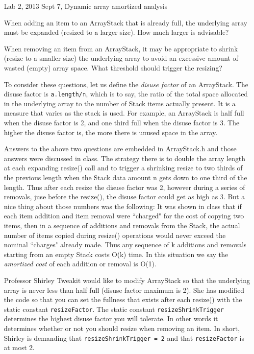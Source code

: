 \documentclass[]{article}
\begin{document}
\begin{center}
Lab 2, 2013 Sept 7, Dynamic array amortized analysis
\end{center}

When adding an item to an ArrayStack that is already full, the underlying array must be expanded (resized to a larger size).  How much larger is advisable?

When removing an item from an ArrayStack, it may be appropriate to shrink (resize to a smaller size) the underlying array to avoid an excessive amount of wasted (empty) array space.
What threshold should trigger the resizing?

To consider these questions,
let us define the {\em disuse factor} of an ArrayStack.  The disuse factor is \verb|a.length/n|, which is to say, the ratio of 
the total space allocated in the underlying array to the number of Stack items actually present.  It is a measure that varies as the stack is used.
For example,
an ArrayStack is half full when the disuse factor is 2, and one third full when the disuse factor is 3. The higher the disuse factor is, the more there is unused space in the array.

Answers to the above two questions are embedded in ArrayStack.h and those answers were discussed in class.  The strategy there is to double the array length at each expanding resize() call and to trigger a shrinking resize to two thirds of the previous length when the Stack data amount n gets down to one third of the length.  Thus after each resize the disuse factor was 2, however during a series of removals, juse before the resize(), the disuse factor could get as high as 3.  But a nice thing about those numbers was the following:  It was shown in class that if each item addition and item removal were ``charged" for the cost of copying two items, then in a sequence of additions and removals from the Stack, the actual number of items copied during resize() operations would never exceed the nominal ``charges" already made.  Thus any sequence of k additions and removals starting from an empty Stack costs O(k) time.  In this situation we say the {\em amortized cost} of each addition or removal is O(1).

Professor Shirley Tweakit would like to modify ArrayStack so that the underlying array is never less than half full (disuse factor maximum is 2).  She has modified the code so that you can set the fullness that exists after each resize() with the static constant \verb|resizeFactor|.  The static constant \verb|resizeShrinkTrigger| determines the highest disuse factor you will tolerate.  In other words it determines whether or not you should resize when removing an item.  In short, Shirley is demanding that \verb|resizeShrinkTrigger = 2| and that \verb|resizeFactor| is at most 2.
\end{document}
